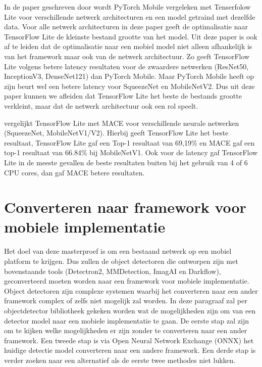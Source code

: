 
In de paper geschreven door \cite{luo_comparison_2020} wordt PyTorch Mobile vergeleken met Tenserfolow Lite voor verschillende netwerk architecturen en een model getraind met dezelfde data.
Voor alle netwerk architecturen in deze paper geeft de optimalisatie naar TensorFlow Lite de kleinste bestand grootte van het model. 
Uit deze paper is ook af te leiden dat de optimalisatie naar een mobiel model niet alleen afhankelijk is van het framework maar ook van de netwerk architectuur.
Zo geeft TensorFlow Lite volgens \cite{luo_comparison_2020} betere latency resultaten voor de zwaardere netwerken (ResNet50, InceptionV3, DenseNet121) dan PyTorch Mobile.
Maar PyTorch Mobile heeft op zijn beurt wel een betere latency voor SqueezeNet en MobileNetV2.
Dus uit deze paper kunnen we afleiden dat TensorFlow Lite het beste de bestands grootte verkleint, maar dat de netwerk architectuur ook een rol speelt.

\cite{febvay_low-level_2020} vergelijkt TensorFlow Lite met MACE voor verschillende neurale netwerken (SqueezeNet, MobileNetV1/V2).
Hierbij geeft TensorFlow Lite het beste resultaat, TensorFlow Lite gaf een Top-1 resultaat van 69,19\% en MACE gaf een top-1 resultaat van 66.84\% bij MobileNetV1.
Ook voor de latency gaf TensorFlow Lite in de meeste gevallen de beste resultaten buiten bij het gebruik van 4 of 6 CPU cores, dan gaf MACE betere resultaten.  

\section{Converteren naar framework voor mobiele implementatie}
Het doel van deze masterproef is om een bestaand netwerk op een mobiel platform te krijgen.
Dus zullen de object detectoren die ontworpen zijn met bovenstaande tools (Detectron2, MMDetection, ImagAI en Darkflow), geconverteerd moeten worden naar een framework voor mobiele implementatie.
Object detectoren zijn complexe systemen waarbij het converteren naar een ander framework complex of zelfs niet mogelijk zal worden.
In deze paragraaf zal per objectdetector bibliotheek gekeken worden wat de mogelijkheden zijn om van een detector model naar een mobiele implementatie te gaan.
De eerste stap zal zijn om te kijken welke mogelijkheden er zijn zonder te converteren naar een ander framework.
Een tweede stap is via Open Neural Network Exchange (ONNX) het huidige detectie model converteren naar een andere framework.
Een derde stap is verder zoeken naar een alternatief als de eerste twee methodes niet lukken.

